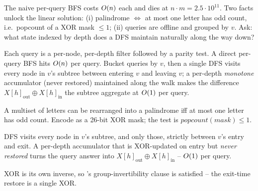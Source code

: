 \begin{attemptgate}
The naive per-query BFS costs $O(n)$ each and dies at $n\cdot m =
2.5\cdot 10^{11}$. Two facts unlock the linear solution: (i) palindrome
$\iff$ at most one letter has odd count, i.e.\ popcount of a XOR mask
$\le 1$; (ii) queries are offline and grouped by $v$. Ask: what state
indexed by depth does a DFS maintain naturally along the way down?
\end{attemptgate}

Each query is a per-node, per-depth filter followed by a parity test.
A direct per-query BFS hits $O(n)$ per query. Bucket queries by
$v$, then a single DFS visits every node in $v$'s subtree between
entering $v$ and leaving $v$; a per-depth \emph{monotone} accumulator
(never restored) maintained along the walk makes the difference
$\mathit{X}[h]_{\mathrm{out}}\oplus\mathit{X}[h]_{\mathrm{in}}$ the
subtree aggregate at $O(1)$ per query.

\begin{observation}
A multiset of letters can be rearranged into a palindrome iff at most
one letter has odd count. Encode as a 26-bit XOR mask; the test is
$\mathit{popcount}(\mathit{mask}) \le 1$.
\end{observation}
\begin{observation}
DFS visits every node in $v$'s subtree, and only those, strictly
between $v$'s entry and exit. A per-depth accumulator that is
XOR-updated on entry but \emph{never restored} turns the query answer
into $\mathit{X}[h]_{\mathrm{out}}\oplus\mathit{X}[h]_{\mathrm{in}}$ --
$O(1)$ per query.
\end{observation}
\begin{observation}
XOR is its own inverse, so 's group-invertibility
clause is satisfied -- the exit-time restore is a single XOR.
\end{observation}


